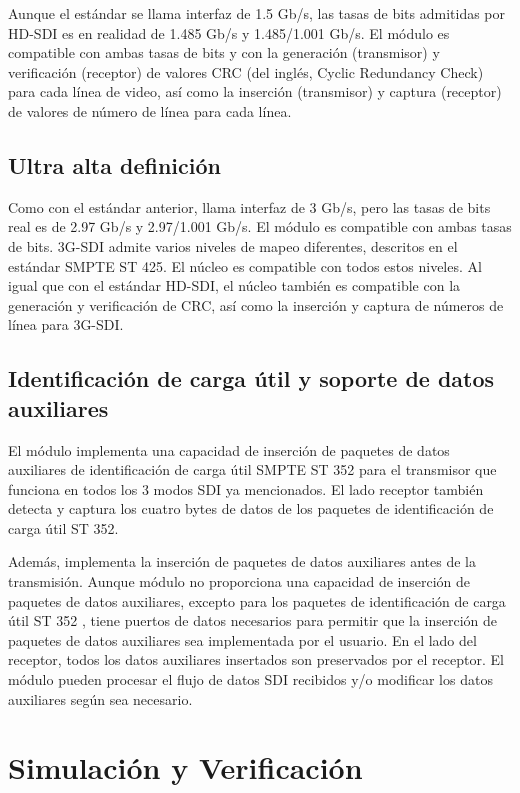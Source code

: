 Aunque el estándar se llama interfaz de 1.5 Gb/s, las tasas de bits admitidas
por HD-SDI es en realidad de 1.485 Gb/s y 1.485/1.001 Gb/s. El módulo es
compatible con ambas tasas de bits y con la generación (transmisor) y
verificación (receptor) de valores CRC (del inglés, Cyclic Redundancy Check)
para cada línea de video, así como la inserción (transmisor) y captura (receptor)
de valores de número de línea para cada línea.

\subsection{Ultra alta definición}

Como con el estándar anterior, llama interfaz de 3 Gb/s, pero las tasas de bits
real es de 2.97 Gb/s y 2.97/1.001 Gb/s. El módulo es compatible con ambas tasas
de bits. 3G-SDI admite varios niveles de mapeo diferentes, descritos en el
estándar SMPTE ST 425. El núcleo es compatible con todos estos niveles. Al
igual que con el estándar HD-SDI, el núcleo también es compatible con la
generación y verificación de CRC, así como la inserción y captura de números de
línea para 3G-SDI\@.

\subsection{Identificación de carga útil y soporte de datos auxiliares}

El módulo implementa una capacidad de inserción de paquetes de datos auxiliares
de identificación de carga útil SMPTE ST 352 \citep{st352} para el transmisor que funciona en
todos los 3 modos SDI ya mencionados. El lado receptor también detecta y captura
los cuatro bytes de datos de los paquetes de identificación de carga útil ST 352.

Además, implementa la inserción de paquetes de datos auxiliares antes de la
transmisión. Aunque módulo no proporciona una capacidad de inserción de paquetes
de datos auxiliares, excepto para los paquetes de identificación de carga útil
ST 352 \citep{st352}, tiene puertos de datos necesarios para permitir que la inserción de
paquetes de datos auxiliares sea implementada por el usuario. En el lado del
receptor, todos los datos auxiliares insertados son preservados por el receptor.
El módulo pueden procesar el flujo de datos SDI recibidos y/o modificar los datos
auxiliares según sea necesario.

\section{Simulación y Verificación}

